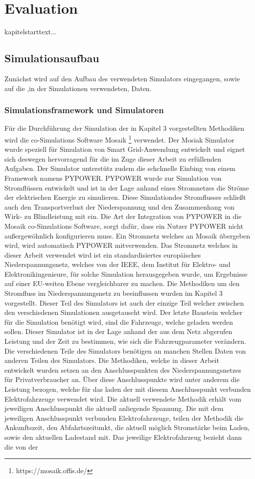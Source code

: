 \chapter{Evaluation}
kapitelstarttext...
\section{Simulationsaufbau}
Zunächst wird auf den Aufbau des verwendeten Simulators eingegangen, sowie auf die ,in der Simulationen verwendeten, Daten.
\subsection{Simulationsframework und Simulatoren}
Für die Durchführung der Simulation der in Kapitel 3 vorgestellten Methodiken wird die co-Simulations Software Mosaik \footnote{https://mosaik.offis.de/} verwendet. Der Mosiak Simulator wurde speziell für Simulation von Smart Grid-Anwendung entwickelt und eignet sich deswegen hervorragend für die im Zuge dieser Arbeit zu erfüllenden Aufgaben. Der Simulator unterstütz zudem die schchnelle Einbing von einem Framework namens PYPOWER. PYPOWER wurde zur Simulation von Stromflüssen entwickelt und ist in der Lage anhand eines Stromnetzes die Ströme der elektrischen Energie zu simulieren. Diese Simulationdes Stromflusses schließt auch den Transportverlust der Niederspannung und den Zusammenhang von Wirk- zu Blindleistung mit ein. Die Art der Integration von PYPOWER in die Mosaik co-Simulations Software, sorgt dafür, dass ein Nutzer PYPOWER nicht außergewöhnlich konfigurieren muss. Ein Stromnetz welches an Mosaik übergeben wird, wird automatisch PYPOWER mitverwenden. Das Stromnetz welches in dieser Arbeit verwendet wird ist ein standardisiertes europäisches Niederspannungsnetz, welches von der IEEE, dem Institut für Elektro- und Elektronikingenieure, für solche Simulation herausgegeben wurde, um Ergebnisse auf einer EU-weiten Ebene vergleichbarer zu machen. Die Methodiken um den Stromfluss im Niederspannungsnetz zu beeinflussen wurden im Kapitel 3 vorgestellt. Dieser Teil des Simulators ist auch der einzige Teil welcher zwischen den verschiedenen Simulationen ausgetauscht wird. Der letzte Baustein welcher für die Simulation benötigt wird, sind die Fahrzeuge, welche geladen werden sollen. Dieser Simulator ist in der Lage anhand der aus dem Netz abgerufen Leistung und der Zeit zu bestimmen, wie sich die Fahrzeugparameter verändern. Die verschiedenen Teile des Simulators benötigen an manchen Stellen Daten von anderen Teilen des Simulators. Die Methodiken, welche in dieser Arbeit entwickelt wurden setzen an den Anschlusspunkten des Niederspannungsnetzes für Privatverbraucher an. Über diese Anschlusspunkte wird unter anderem die Leistung bezogen, welche für das laden der mit diesem Anschlusspunkt verbunden Elektrofahrzeuge verwendet wird. Die aktuell verwendete Methodik erhält vom jeweiligen Anschlusspunkt die aktuell anliegende Spannung. Die mit dem jeweiligen Anschlusspunkt verbunden Elektrofahrzeuge, teilen der Methodik die Ankunftszeit, den Abfahrtszeitunkt, die aktuell möglich Stromstärke beim Laden, sowie den aktuellen Ladestand mit. Das jeweilige Elektrofahrzeug bezieht dann die von der 